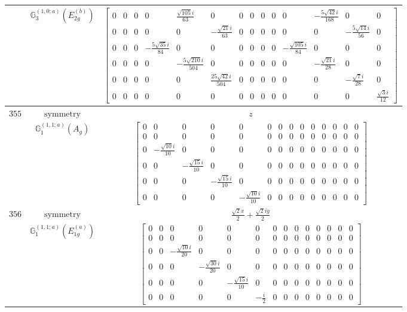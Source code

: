 \documentclass[fleqn,8pt,landscape]{jsarticle}
\begin{document}
\begin{longtable}{ccc}
$  $ & $ \mathbb{G}_{3}^{(1,0;a)}(E_{2g}^{(b)}) $ & $ \begin{bmatrix} 0 & 0 & 0 & 0 & \frac{\sqrt{105} i}{63} & 0 & 0 & 0 & 0 & 0 & 0 & - \frac{5 \sqrt{42} i}{168} & 0 & 0 \\ 0 & 0 & 0 & 0 & 0 & - \frac{\sqrt{21} i}{63} & 0 & 0 & 0 & 0 & 0 & 0 & - \frac{5 \sqrt{14} i}{56} & 0 \\ 0 & 0 & 0 & - \frac{5 \sqrt{35} i}{84} & 0 & 0 & 0 & 0 & 0 & 0 & - \frac{\sqrt{105} i}{84} & 0 & 0 & 0 \\ 0 & 0 & 0 & 0 & - \frac{5 \sqrt{210} i}{504} & 0 & 0 & 0 & 0 & 0 & 0 & - \frac{\sqrt{21} i}{28} & 0 & 0 \\ 0 & 0 & 0 & 0 & 0 & \frac{25 \sqrt{42} i}{504} & 0 & 0 & 0 & 0 & 0 & 0 & - \frac{\sqrt{7} i}{28} & 0 \\ 0 & 0 & 0 & 0 & 0 & 0 & 0 & 0 & 0 & 0 & 0 & 0 & 0 & \frac{\sqrt{3} i}{12} \end{bmatrix} $ \\ \hline
$ 355 $ & $ \text{symmetry} $ & $ z $ \\
$  $ & $ \mathbb{G}_{1}^{(1,1;a)}(A_{g}) $ & $ \begin{bmatrix} 0 & 0 & 0 & 0 & 0 & 0 & 0 & 0 & 0 & 0 & 0 & 0 & 0 & 0 \\ 0 & 0 & 0 & 0 & 0 & 0 & 0 & 0 & 0 & 0 & 0 & 0 & 0 & 0 \\ 0 & - \frac{\sqrt{10} i}{10} & 0 & 0 & 0 & 0 & 0 & 0 & 0 & 0 & 0 & 0 & 0 & 0 \\ 0 & 0 & - \frac{\sqrt{15} i}{10} & 0 & 0 & 0 & 0 & 0 & 0 & 0 & 0 & 0 & 0 & 0 \\ 0 & 0 & 0 & - \frac{\sqrt{15} i}{10} & 0 & 0 & 0 & 0 & 0 & 0 & 0 & 0 & 0 & 0 \\ 0 & 0 & 0 & 0 & - \frac{\sqrt{10} i}{10} & 0 & 0 & 0 & 0 & 0 & 0 & 0 & 0 & 0 \end{bmatrix} $ \\ \hline
$ 356 $ & $ \text{symmetry} $ & $ \frac{\sqrt{2} x}{2} + \frac{\sqrt{2} i y}{2} $ \\
$  $ & $ \mathbb{G}_{1}^{(1,1;a)}(E_{1g}^{(a)}) $ & $ \begin{bmatrix} 0 & 0 & 0 & 0 & 0 & 0 & 0 & 0 & 0 & 0 & 0 & 0 & 0 & 0 \\ 0 & 0 & 0 & 0 & 0 & 0 & 0 & 0 & 0 & 0 & 0 & 0 & 0 & 0 \\ 0 & 0 & - \frac{\sqrt{10} i}{20} & 0 & 0 & 0 & 0 & 0 & 0 & 0 & 0 & 0 & 0 & 0 \\ 0 & 0 & 0 & - \frac{\sqrt{30} i}{20} & 0 & 0 & 0 & 0 & 0 & 0 & 0 & 0 & 0 & 0 \\ 0 & 0 & 0 & 0 & - \frac{\sqrt{15} i}{10} & 0 & 0 & 0 & 0 & 0 & 0 & 0 & 0 & 0 \\ 0 & 0 & 0 & 0 & 0 & - \frac{i}{2} & 0 & 0 & 0 & 0 & 0 & 0 & 0 & 0 \end{bmatrix} $ \\ \hline

\end{longtable}
\end{document}
